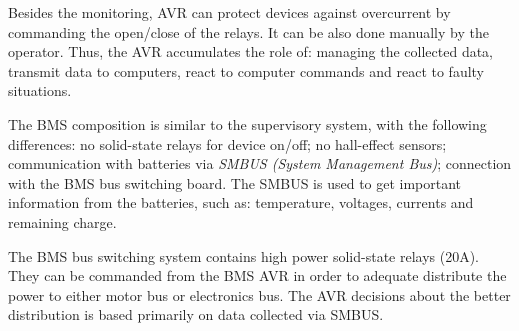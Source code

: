 \documentclass{ifacconf}
\begin{document}
Besides the monitoring, AVR can protect devices against overcurrent by
commanding the open/close of the relays. It can be also done manually by the
operator. Thus, the AVR accumulates the role of: managing the collected
data, transmit data to computers, react to computer commands and react to
faulty situations.
 
The BMS composition is similar to the supervisory system, with the following
differences: no solid-state relays for device on/off; no hall-effect sensors;
communication with batteries via \emph{SMBUS (System Management Bus)};
connection with the BMS bus switching board. The SMBUS is used to get important
information from the batteries, such as: temperature, voltages, currents and
remaining charge. 

The BMS bus switching system contains high power solid-state relays (20A). They
can be commanded from the BMS AVR in order to adequate distribute the power to
either motor bus or electronics bus. The AVR decisions about the better
distribution is based primarily on data collected via SMBUS.
\end{document}
